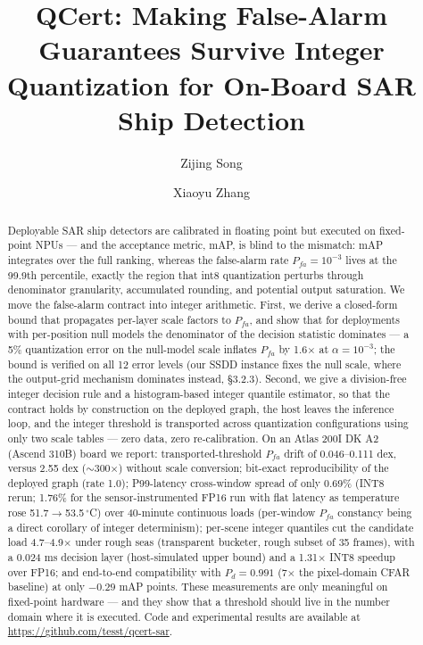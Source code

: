 \documentclass[preprint,12pt]{elsarticle}
\begin{document}
\begin{frontmatter}

\title{QCert: Making False-Alarm Guarantees Survive Integer Quantization
       for On-Board SAR Ship Detection}

\author[inst1]{Zijing Song}
\author[inst1]{Xiaoyu Zhang}

\begin{abstract}
Deployable SAR ship detectors are calibrated in floating point but executed on
fixed-point NPUs --- and the acceptance metric, mAP, is blind to the mismatch:
mAP integrates over the full ranking, whereas the false-alarm rate
$P_{fa}=10^{-3}$ lives at the 99.9th percentile, exactly the region that int8
quantization perturbs through denominator granularity, accumulated rounding,
and potential output saturation. We move the false-alarm contract into integer
arithmetic. First, we derive a closed-form bound that propagates per-layer
scale factors to $P_{fa}$, and show that for deployments with per-position null
models the denominator of the decision statistic dominates --- a 5\%
quantization error on the null-model scale inflates $P_{fa}$ by 1.6$\times$ at
$\alpha=10^{-3}$; the bound is verified on all 12 error levels (our SSDD
instance fixes the null scale, where the output-grid mechanism dominates
instead, \S3.2.3). Second, we give a division-free integer decision rule and a
histogram-based integer quantile estimator, so that the contract holds by
construction on the deployed graph, the host leaves the inference loop, and the
integer threshold is transported across quantization configurations using only
two scale tables --- zero data, zero re-calibration. On an Atlas 200I DK A2
(Ascend 310B) board we report: transported-threshold $P_{fa}$ drift of
0.046--0.111 dex, versus 2.55 dex ($\sim$300$\times$) without scale
conversion; bit-exact reproducibility of the deployed graph (rate 1.0);
P99-latency cross-window spread of only 0.69\% (INT8 rerun; 1.76\% for the
sensor-instrumented FP16 run with flat latency as temperature rose
51.7$\to$53.5\,$^\circ$C) over 40-minute continuous loads (per-window
$P_{fa}$ constancy being a direct corollary of integer determinism); per-scene
integer quantiles cut the candidate load 4.7--4.9$\times$ under rough seas
(transparent bucketer, rough subset of 35 frames), with a 0.024 ms decision
layer (host-simulated upper bound) and a 1.31$\times$ INT8 speedup over FP16;
and end-to-end compatibility with $P_d=0.991$ (7$\times$ the pixel-domain CFAR
baseline) at only $-0.29$ mAP points. These measurements are only meaningful
on fixed-point hardware --- and they show that a threshold should live in the
number domain where it is executed. Code and experimental results are available at
\url{https://github.com/tesst/qcert-sar}.
\end{abstract}


\end{frontmatter}
\end{document}
